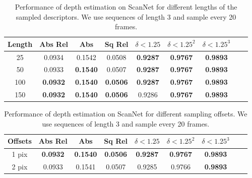 \documentclass[runningheads]{llncs}
\begin{document}
\begin{table}[h]
  \caption{Performance of depth estimation on ScanNet for different lengths of the sampled descriptors. We use sequences of length 3 and sample every 20 frames. }
  \centering
\begin{tabular}{ccccccccc}
 \hline 
   Length  &Abs Rel  &Abs & Sq Rel & \textbf{$\delta< 1.25$}& \textbf{$\delta < 1.25^2$}& \textbf{$\delta< 1.25^3$}\\
    \hline
25 & 0.0934&	0.1542&	0.0508&	\textbf{0.9287}&	\textbf{0.9767}&	\textbf{0.9893}\\
50 & 0.0933&\textbf{0.1540}&	0.0507&	\textbf{0.9287}&	\textbf{0.9767}&	\textbf{0.9893}\\
100 & \textbf{0.0932} & \textbf{0.1540} & \textbf{0.0506} &  \textbf{0.9287} & \textbf{0.9767} & \textbf{0.9893} \\
150 &\textbf{0.0932}&	\textbf{0.1540}&	\textbf{0.0506}&	0.9286&	\textbf{0.9767}&	\textbf{0.9893}\\

\hline
  \end{tabular}
\label{tablelength}
\end{table}



\begin{table}[t]
  \caption{Performance of depth estimation on ScanNet for different sampling offsets. We use sequences of length 3 and sample every 20 frames. }
  \centering
\begin{tabular}{ccccccccc}
 \hline 
   Offsets  &Abs Rel  &Abs & Sq Rel & \textbf{$\delta< 1.25$}& \textbf{$\delta < 1.25^2$}& \textbf{$\delta< 1.25^3$}\\

    \hline

1 pix &	\textbf{0.0932} & \textbf{0.1540} & \textbf{0.0506} &  \textbf{0.9287} & \textbf{0.9767} & \textbf{0.9893} \\
2 pix &0.0933&	0.1541&	0.0507&	0.9285&	0.9766&	\textbf{0.9893}\\

\hline
  \end{tabular}
\label{tableoff}
\end{table}
\end{document}

